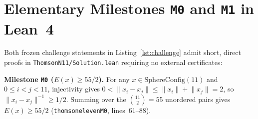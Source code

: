 \documentclass[11pt,reqno]{amsart}
\renewcommand{\_}{\origunderscore\allowbreak}
\renewcommand{\paragraph}[1]{\medskip\noindent\textbf{#1}\enspace}
\theoremstyle{definition}
\newcommand{\norm}[1]{\lVert #1 \rVert}
\begin{document}
\section{Elementary Milestones \texorpdfstring{\textnormal{\texttt{M0}}}{M0} and \texorpdfstring{\textnormal{\texttt{M1}}}{M1} in Lean~4}\label{sec:milestones}

Both frozen challenge statements in Listing~\ref{lst:challenge} admit short, direct proofs in \texttt{ThomsonN11/\allowbreak Solution.lean} requiring no external certificates:

\paragraph{Milestone \texttt{M0} ($E(x) \ge 55/2$).}
For any $x \in \mathrm{SphereConfig}(11)$ and $0 \le i < j < 11$, injectivity gives $0 < \norm{x_i - x_j} \le \norm{x_i} + \norm{x_j} = 2$, so $\norm{x_i - x_j}^{-1} \ge 1/2$. Summing over the $\binom{11}{2} = 55$ unordered pairs gives $E(x) \ge 55/2$ (\texttt{thomson\_eleven\_M0}, lines~61--88).
\end{document}
